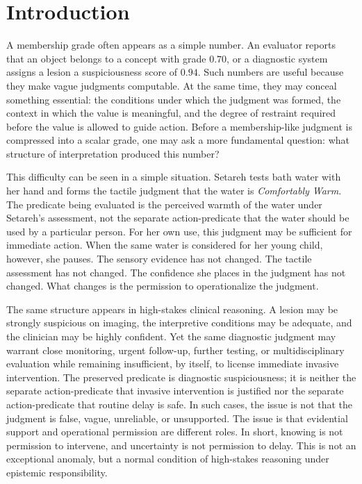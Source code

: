 \documentclass[reqno,final]{amsart}
\theoremstyle{definition}
\theoremstyle{plain}
\theoremstyle{remark}
\begin{document}
\maketitle

\section{Introduction}
\label{sec:introduction}
\label{subsec:knowing-is-not-permission}

A membership grade often appears as a simple number. An evaluator reports that an object belongs to a concept with grade \(0.70\), or a diagnostic system assigns a lesion a suspiciousness score of \(0.94\). Such numbers are useful because they make vague judgments computable. At the same time, they may conceal something essential: the conditions under which the judgment was formed, the context in which the value is meaningful, and the degree of restraint required before the value is allowed to guide action. Before a membership-like judgment is compressed into a scalar grade, one may ask a more fundamental question: what structure of interpretation produced this number?

This difficulty can be seen in a simple situation. Setareh tests bath water with her hand and forms the tactile judgment that the water is \emph{Comfortably Warm}. The predicate being evaluated is the perceived warmth of the water under Setareh's assessment, not the separate action-predicate that the water should be used by a particular person. For her own use, this judgment may be sufficient for immediate action. When the same water is considered for her young child, however, she pauses. The sensory evidence has not changed. The tactile assessment has not changed. The confidence she places in the judgment has not changed. What changes is the permission to operationalize the judgment.

The same structure appears in high-stakes clinical reasoning. A lesion may be strongly suspicious on imaging, the interpretive conditions may be adequate, and the clinician may be highly confident. Yet the same diagnostic judgment may warrant close monitoring, urgent follow-up, further testing, or multidisciplinary evaluation while remaining insufficient, by itself, to license immediate invasive intervention. The preserved predicate is diagnostic suspiciousness; it is neither the separate action-predicate that invasive intervention is justified nor the separate action-predicate that routine delay is safe. In such cases, the issue is not that the judgment is false, vague, unreliable, or unsupported. The issue is that evidential support and operational permission are different roles. In short, knowing is not permission to intervene, and uncertainty is not permission to delay. This is not an exceptional anomaly, but a normal condition of high-stakes reasoning under epistemic responsibility.
\end{document}
